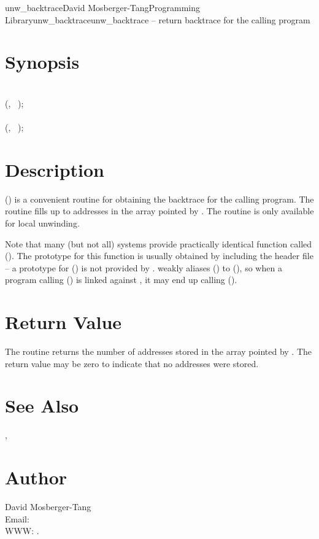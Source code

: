 \documentclass{article}
\begin{document}
\begin{Name}{3}{unw\_backtrace}{David Mosberger-Tang}{Programming Library}{unw\_backtrace}unw\_backtrace -- return backtrace for the calling program
\end{Name}

\section{Synopsis}

\\

 (, ~);\\

\\

 (, ~);\\

\section{Description}

() is a convenient routine for obtaining the backtrace for
the calling program. The routine fills up to  addresses in the array
pointed by . The routine is only available for local unwinding.

Note that many (but not all) systems provide practically identical function
called (). The prototype for this function is usually obtained
by including the  header file -- a prototype for
() is not provided by .  weakly
aliases () to (), so when a program
calling () is linked against , it may end up
calling ().

\section{Return Value}

The routine returns the number of addresses stored in the array pointed by
. The return value may be zero to indicate that no addresses were
stored.

\section{See Also}

,

\section{Author}

\noindent
David Mosberger-Tang\\
Email: \\
WWW: .
\LatexManEnd
\end{document}
